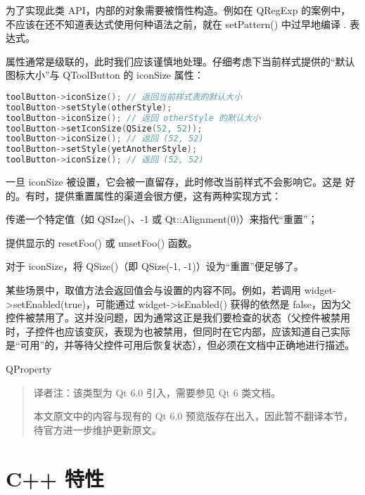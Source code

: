 为了实现此类 API，内部的对象需要被惰性构造。例如在 QRegExp 的案例中，不应该在还不知道表达式使用何种语法之前，就在 setPattern() 中过早地编译 . 表达式。

属性通常是级联的，此时我们应该谨慎地处理。仔细考虑下当前样式提供的“默认图标大小”与 QToolButton 的 iconSize 属性：

\begin{lstlisting}[language=C++]
toolButton->iconSize(); // 返回当前样式表的默认大小
toolButton->setStyle(otherStyle);
toolButton->iconSize(); // 返回 otherStyle 的默认大小
toolButton->setIconSize(QSize(52, 52));
toolButton->iconSize(); // 返回 (52, 52)
toolButton->setStyle(yetAnotherStyle);
toolButton->iconSize(); // 返回 (52, 52) 
\end{lstlisting}


\begin{notice}
	一旦 iconSize 被设置，它会被一直留存，此时修改当前样式不会影响它。这是 好的。有时，提供重置属性的渠道会很方便，这有两种实现方式：

\end{notice}

\begin{compactitem}[\arr]
	\item 传递一个特定值（如 QSIze()、-1 或 Qt::Alignment(0)）来指代“重置”；
	\item 提供显示的 resetFoo() 或 unsetFoo() 函数。
\end{compactitem}

对于 iconSize，将 QSize()（即 QSize(-1, -1)）设为“重置”便足够了。

某些场景中，取值方法会返回值会与设置的内容不同。例如，若调用 widget->setEnabled(true)，可能通过 widget->isEnabled() 获得的依然是 false，因为父控件被禁用了。这并没问题，因为通常这正是我们要检查的状态（父控件被禁用时，子控件也应该变灰，表现为也被禁用，但同时在它内部，应该知道自己实际是“可用”的，并等待父控件可用后恢复状态），但必须在文档中正确地进行描述。

QProperty

\begin{quote}
译者注：该类型为 Qt 6.0 引入，需要参见 Qt 6 类文档。

本文原文中的内容与现有的 Qt 6.0 预览版存在出入，因此暂不翻译本节，待官方进一步维护更新原文。
\end{quote}

\section{C++ 特性}

